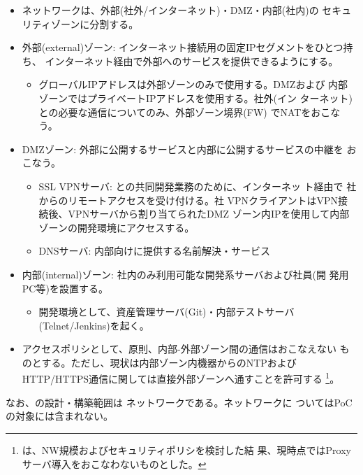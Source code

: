 \begin{itemize}
 \item \yo ネットワークは、外部(社外/インターネット)・DMZ・内部(社内)の
       セキュリティゾーンに分割する。
 \item 外部(external)ゾーン: インターネット接続用の固定IPセグメントをひとつ持ち、
       インターネット経由で外部へのサービスを提供できるようにする。
       \begin{itemize}
        \item グローバルIPアドレスは外部ゾーンのみで使用する。DMZおよび
              内部ゾーンではプライベートIPアドレスを使用する。社外(イン
              ターネット)との必要な通信についてのみ、外部ゾーン境界(FW)
              でNATをおこなう。
       \end{itemize}
 \item DMZゾーン: 外部に公開するサービスと内部に公開するサービスの中継を
       おこなう。
       \begin{itemize}
        \item SSL VPNサーバ: \tj との共同開発業務のために、インターネッ
              ト経由で \tj 社からのリモートアクセスを受け付ける。\tj 社
              VPNクライアントはVPN接続後、VPNサーバから割り当てられたDMZ
              ゾーン内IPを使用して内部ゾーンの開発環境にアクセスする。
        \item DNSサーバ: \yo 内部向けに提供する名前解決・サービス
       \end{itemize}
 \item 内部(internal)ゾーン: 社内のみ利用可能な開発系サーバおよび社員(開
       発用PC等)を設置する。
       \begin{itemize}
        \item 開発環境として、資産管理サーバ(Git)・内部テストサーバ
              (Telnet/Jenkins)を起く。
       \end{itemize}
 \item アクセスポリシとして、原則、内部-外部ゾーン間の通信はおこなえない
       ものとする。ただし、現状は内部ゾーン内機器からのNTPおよび
       HTTP/HTTPS通信に関しては直接外部ゾーンへ通すことを許可する
       \footnote{\tj は、\yo NW規模およびセキュリティポリシを検討した結
       果、現時点ではProxyサーバ導入をおこなわないものとした。}。
\end{itemize}

なお、\tj の設計・構築範囲は \yo ネットワークである。\tj ネットワークに
ついてはPoCの対象には含まれない。


